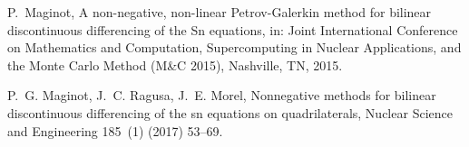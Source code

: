 \documentclass[xchauthor,chkrefs,fixeqskip,GCNS,amsmath,amsthm]{yjcphg}
\theoremstyle{remark}
\begin{document}
\begin{backmatter}
\begin{thebibliography}{}
\begin{bsubitem}
\begin{bcontribution}%
\end{bcontribution}
\begin{bhost}
\begin{beditedbook}
\end{beditedbook}
\end{bhost}
\end{bsubitem}
%
\OrigBibText
P.~Maginot, A non-negative, non-linear {P}etrov-{G}alerkin method for
bilinear discontinuous differencing of the {S}n equations, in: Joint
International Conference on Mathematics and Computation, Supercomputing
in Nuclear Applications, and the Monte Carlo Method (M\&C 2015),
Nashville, TN, 2015.
\endOrigBibText
{}%
\endbibitem

\begin{bsubitem}
\begin{bcontribution}%
\end{bcontribution}
\begin{bhost}
\begin{bissue}
\end{bissue}
\end{bhost}
\end{bsubitem}
%
\OrigBibText
P.~G. Maginot, J.~C. Ragusa, J.~E. Morel, Nonnegative methods for
bilinear discontinuous differencing of the sn equations on
quadrilaterals, Nuclear Science and Engineering 185~(1) (2017) 53--69.
\endOrigBibText
{}%
\endbibitem


\end{thebibliography}
\end{backmatter}
\end{document}
